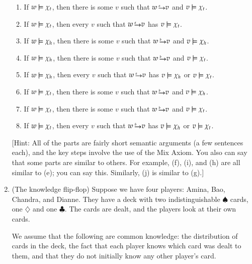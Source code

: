 \documentclass[11pt]{article}
\newcommand{\abovearrow}[1]{\rightarrow\hspace{-.17in}\raisebox{1.0ex}
{$\scriptscriptstyle{#1}$}\hspace{.1in}}
\newcommand{\arrowa}{\,\lower1pt\hbox{$\abovearrow{a}$}}
\newcommand{\arrowb}{\,\lower1pt\hbox{$\abovearrow{b}$}}
\begin{document}
\begin{enumerate}
\begin{enumerate}
\item 
  If $w\models \chi_{t}$, then there is some $v$ such that $w\arrowa v$ 
and $v\models  \chi_{t}$.

\item  If $w\models \chi_{t}$,  then every $v$ such that $w\arrowa v$  
has $v\models  \chi_{t}$.




\item 
  If $w\models \chi_{h}$, then there is some $v$ such that $w\arrowb v$ 
and $v\models  \chi_{h}$.


\item 
  If $w\models \chi_{h}$, then there is some $v$ such that $w\arrowb v$ 
and $v\models  \chi_{t}$.


\item  If $w\models \chi_{h}$,  then every $v$ such that $w\arrowa v$  
has $v\models  \chi_{h}$ or $v\models  \chi_{t}$.


\item 
  If $w\models \chi_{t}$, then there is some $v$ such that $w\arrowb v$ 
and $v\models  \chi_{h}$.


\item 
  If $w\models \chi_{t}$, then there is some $v$ such that $w\arrowb v$ 
and $v\models  \chi_{t}$.


\item   If $w\models \chi_{t}$, then every $v$ such that $w\arrowb v$  
has $v\models  \chi_{h}$ or $v\models  \chi_{t}$.




\end{enumerate}

[Hint: All of the parts are fairly short semantic arguments (a few sentences each), 
and the key steps
involve the use of the Mix Axiom. 
You also can say that some parts are similar to others.   For example,
(f), (i), and (h) are all similar to (e); you can say this.
Similarly, (j) is similar to (g).]
 

\item  (The knowledge flip-flop)
 Suppose we have four players: Amina, Bao,  Chandra, and Dianne.
They have a deck with two indistinguishable $\spadesuit$
cards, one $\diamondsuit$ and one $\clubsuit$.
  The cards are dealt, and the players look at their own cards.
  
  We assume that the
following are common knowledge:  the distribution of cards in   the
deck, the fact that each player   knows which card was dealt to
them, and that they do not initially know any other player's card.


\end{enumerate}
\end{document}
